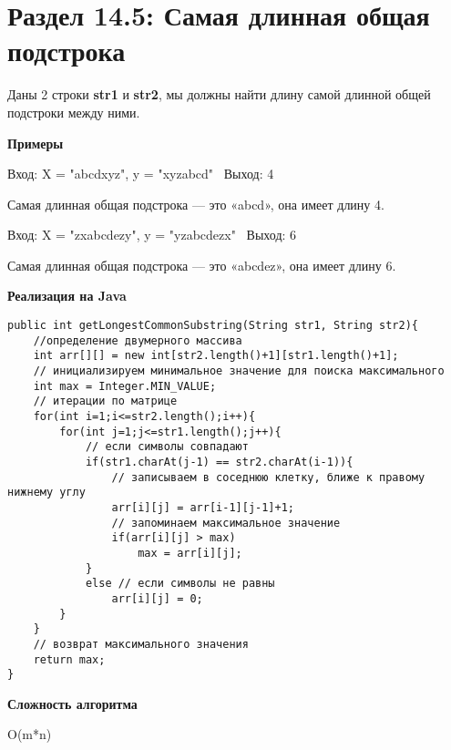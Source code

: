 \vspace{\baselineskip}
\section*{Раздел 14.5: Самая длинная общая подстрока}

\vspace{\baselineskip}
Даны 2 строки \textbf{str1} и \textbf{str2}, мы должны найти длину самой длинной общей подстроки между ними. 

\vspace{\baselineskip}
\textbf{Примеры }


Вход: X = "abcdxyz", y = "xyzabcd" \ Выход: 4

\vspace{\baselineskip}
Самая длинная общая подстрока --- это «abcd», она имеет длину 4.

\vspace{\baselineskip}
Вход: X = "zxabcdezy", y = "yzabcdezx" \ Выход: 6 

\vspace{\baselineskip}
Самая длинная общая подстрока --- это «abcdez», она имеет длину 6. 

\vspace{\baselineskip}
\textbf{Реализация на Java}


\begin{tcolorbox}
\begin{verbatim}
public int getLongestCommonSubstring(String str1, String str2){
	//определение двумерного массива
	int arr[][] = new int[str2.length()+1][str1.length()+1];
	// инициализируем минимальное значение для поиска максимального
	int max = Integer.MIN_VALUE;
	// итерации по матрице
	for(int i=1;i<=str2.length();i++){
		for(int j=1;j<=str1.length();j++){
			// если символы совпадают
			if(str1.charAt(j-1) == str2.charAt(i-1)){
				// записываем в соседнюю клетку, ближе к правому нижнему углу
				arr[i][j] = arr[i-1][j-1]+1;
				// запоминаем максимальное значение
				if(arr[i][j] > max)
					max = arr[i][j];
			}
			else // если символы не равны
				arr[i][j] = 0;
		}
	}
	// возврат максимального значения
	return max;
}

\end{verbatim}
\end{tcolorbox}

\vspace{\baselineskip}
\textbf{Сложность алгоритма }

O(m*n)
